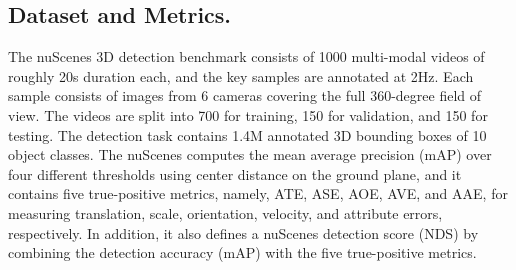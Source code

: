 \documentclass[10pt,twocolumn,letterpaper]{article}
\begin{document}
\subsection{Dataset and Metrics.} 
The nuScenes 3D detection benchmark \cite{nuscenes} consists of 1000 multi-modal videos of roughly 20s duration each, and the key samples are annotated at 2Hz. 
Each sample consists of images from 6 cameras covering the full 360-degree field of view. 
The videos are split into 700 for training, 150 for validation, and 150 for testing. The detection task contains 1.4M annotated 3D bounding boxes of 10 object classes. 
The nuScenes computes the mean average precision (mAP) over four different thresholds using center distance on the ground plane, and it contains five true-positive metrics, namely, ATE, ASE, AOE, AVE, and AAE, for measuring translation, scale, orientation, velocity, and attribute errors, respectively. 
In addition, it also defines a nuScenes detection score (NDS) by combining the detection accuracy (mAP) with the five true-positive metrics.
\end{document}
